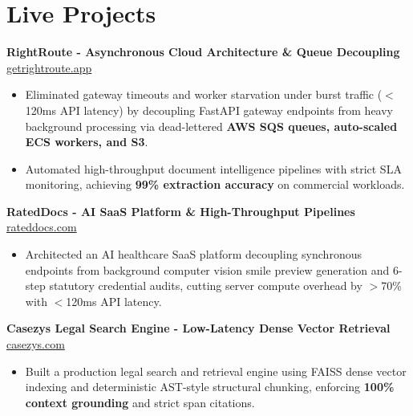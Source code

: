 \documentclass[9.5pt,a4paper]{article}
\begin{document}
\section*{Live Projects}
\noindent
\textbf{RightRoute - Asynchronous Cloud Architecture \& Queue Decoupling} \hfill \href{https://getrightroute.app}{getrightroute.app}
\begin{itemize}
    \item Eliminated gateway timeouts and worker starvation under burst traffic ($<$120ms API latency) by decoupling FastAPI gateway endpoints from heavy background processing via dead-lettered \textbf{AWS SQS queues, auto-scaled ECS workers, and S3}.
    \item Automated high-throughput document intelligence pipelines with strict SLA monitoring, achieving \textbf{99\% extraction accuracy} on commercial workloads.
\end{itemize}
\vspace{0.6pt}
\noindent
\textbf{RatedDocs - AI SaaS Platform \& High-Throughput Pipelines} \hfill \href{https://rateddocs.com}{rateddocs.com}
\begin{itemize}
    \item Architected an AI healthcare SaaS platform decoupling synchronous endpoints from background computer vision smile preview generation and 6-step statutory credential audits, cutting server compute overhead by $>$70\% with $<$120ms API latency.
\end{itemize}
\vspace{0.6pt}
\noindent
\textbf{Casezys Legal Search Engine - Low-Latency Dense Vector Retrieval} \hfill \href{https://casezys.com}{casezys.com}
\begin{itemize}
    \item Built a production legal search and retrieval engine using FAISS dense vector indexing and deterministic AST-style structural chunking, enforcing \textbf{100\% context grounding} and strict span citations.
\end{itemize}
\vspace{0.6pt}
\end{document}
